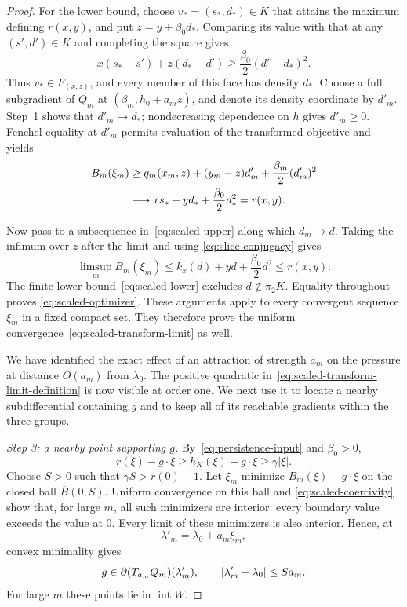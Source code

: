 \begin{proof}
For the lower bound, choose $v_*=(s_*,d_*)\in K$ that attains the
maximum defining $r(x,y)$, and put $z=y+\beta_0d_*$. Comparing its value
with that at any $(s',d')\in K$ and completing the square gives
\begin{equation}
 x(s_*-s')+z(d_*-d')
       \geq\frac{\beta_0}{2}(d'-d_*)^2.
 \label{eq:strict-face-support}
\end{equation}
Thus $v_*\in F_{(x,z)}$, and every member of this face has density $d_*$.
Choose a full subgradient of $Q_m$ at $(\beta_m,h_0+a_mz)$, and denote
its density coordinate by $d'_m$. Step~1 shows that $d'_m\to d_*$;
nondecreasing dependence on $h$ gives $d'_m\geq0$. Fenchel equality at
$d'_m$ permits evaluation of the transformed objective and yields
\begin{align}
 B_m(\xi_m)
 &\geq q_m(x_m,z)+(y_m-z)d'_m
                       +\frac{\beta_m}{2}(d'_m)^2 \notag\\
 &\longrightarrow xs_*+yd_*+\frac{\beta_0}{2}d_*^2
   =r(x,y).
 \label{eq:scaled-lower}
\end{align}

Now pass to a subsequence in~\eqref{eq:scaled-upper} along which
$d_m\to d$. Taking the infimum over $z$ after the limit and using
\eqref{eq:slice-conjugacy} gives
\[
 \limsup_m B_m(\xi_m)
   \leq k_x(d)+yd+\frac{\beta_0}{2}d^2
   \leq r(x,y).
\]
The finite lower bound~\eqref{eq:scaled-lower} excludes
$d\notin\pi_2K$. Equality throughout proves
\eqref{eq:scaled-optimizer}. These arguments apply to every convergent
sequence $\xi_m$ in a fixed compact set. They therefore prove the uniform
convergence~\eqref{eq:scaled-transform-limit} as well.

We have identified the exact effect of an attraction of strength $a_m$
on the pressure at distance $O(a_m)$ from $\lambda_0$. The positive
quadratic in~\eqref{eq:scaled-transform-limit-definition} is now visible
at order one. We next use it to locate a nearby subdifferential containing
$g$ and to keep all of its reachable gradients within the three groups.

\smallskip
\noindent\textit{Step 3: a nearby point supporting $g$.}
By~\eqref{eq:persistence-input} and $\beta_0>0$,
\begin{equation}
 r(\xi)-g\cdot\xi
    \geq h_K(\xi)-g\cdot\xi
    \geq\gamma|\xi|.
 \label{eq:scaled-coercivity}
\end{equation}
Choose $S>0$ such that $\gamma S>r(0)+1$.
Let $\xi_m$ minimize $B_m(\xi)-g\cdot\xi$ on the closed ball
$\overline B(0,S)$. Uniform convergence on this ball and
\eqref{eq:scaled-coercivity} show that, for large $m$, all such minimizers
are interior: every boundary value exceeds the value at $0$. Every
limit of these minimizers is also interior. Hence, at
\[
 \lambda'_m=\lambda_0+a_m\xi_m,
\]
convex minimality gives
\begin{equation}
 g\in\partial(T_{a_m}Q_m)(\lambda'_m),
 \qquad |\lambda'_m-\lambda_0|\leq Sa_m.
 \label{eq:nearby-support}
\end{equation}
For large $m$ these points lie in $\operatorname{int}W$.


\end{proof}

